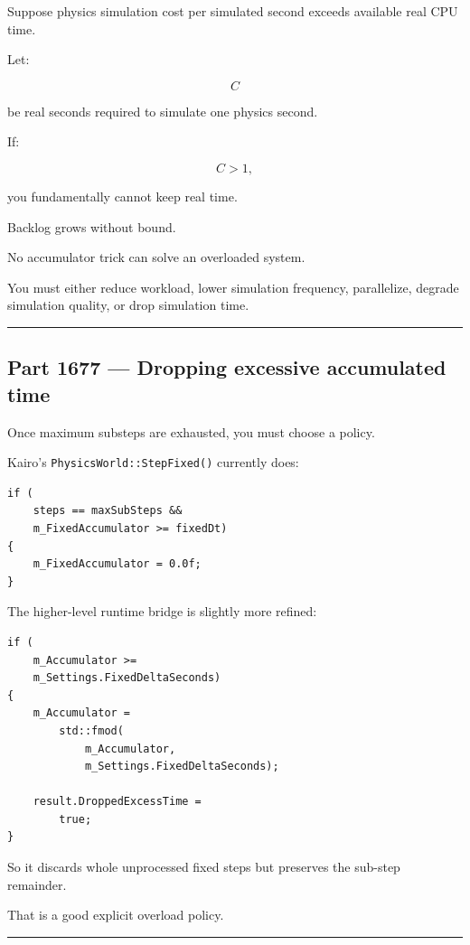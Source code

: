 Suppose physics simulation cost per simulated second exceeds available real CPU time.

Let:

\[
C
\]

be real seconds required to simulate one physics second.

If:

\[
C>1,
\]

you fundamentally cannot keep real time.

Backlog grows without bound.

No accumulator trick can solve an overloaded system.

You must either reduce workload, lower simulation frequency, parallelize, degrade simulation quality, or drop simulation time.

\begin{center}\rule{0.5\linewidth}{0.5pt}\end{center}

\subsection{Part 1677 --- Dropping excessive accumulated time}\label{06-engine-ii-ch037-part-1677-dropping-excessive-accumulated-time}

Once maximum substeps are exhausted, you must choose a policy.

Kairo's \texttt{PhysicsWorld::StepFixed()} currently does:

\begin{verbatim}
if (
    steps == maxSubSteps &&
    m_FixedAccumulator >= fixedDt)
{
    m_FixedAccumulator = 0.0f;
}
\end{verbatim}

The higher-level runtime bridge is slightly more refined:

\begin{verbatim}
if (
    m_Accumulator >=
    m_Settings.FixedDeltaSeconds)
{
    m_Accumulator =
        std::fmod(
            m_Accumulator,
            m_Settings.FixedDeltaSeconds);

    result.DroppedExcessTime =
        true;
}
\end{verbatim}

So it discards whole unprocessed fixed steps but preserves the sub-step remainder.

That is a good explicit overload policy.

\begin{center}\rule{0.5\linewidth}{0.5pt}\end{center}

